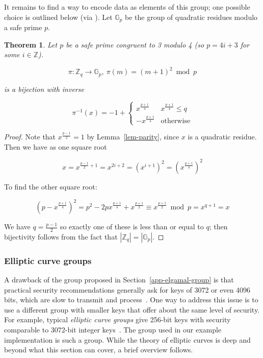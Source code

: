\documentclass[12pt,a4paper]{article}
\newtheorem{theorem}{Theorem}
\theoremstyle{definition}
\begin{document}
It remains to find a way to encode data as elements of this group; one possible choice is outlined below (via \cite{katz2014introduction}). Let $\mathbb{G}_p$ be the group of quadratic residues modulo a safe prime $p$.
\begin{theorem}
    Let $p$ be a safe prime congruent to 3 modulo 4 (so $p=4i+3$ for some $i\in\mathbb{Z}$).

    $$\pi:\mathbb{Z}_q\rightarrow\mathbb{G}_p,\ \pi(m)=(m+1)^2\bmod p$$

    is a bijection with inverse

    $$\pi^{-1}(x)=-1+\begin{cases}
        x^\frac{p+1}{4} & x^\frac{p+1}{4}\leq q\\
        -x^\frac{p+1}{4}&\text{otherwise}
    \end{cases}$$

\end{theorem}
\begin{proof}
    Note that $x^\frac{p-1}{2}=1$ by Lemma~\ref{lem-parity}, since $x$ is a quadratic residue. Then we have as one square root

    $$x=x^{\frac{p-1}{2}+1}=x^{2i+2}=(x^{i+1})^2=\left(x^\frac{p+1}{4}\right)^2$$

    To find the other square root:

    $$\left(p-x^\frac{p+1}{4}\right)^2=p^2-2px^\frac{p+1}{4}+x^\frac{p+1}{2}\equiv x^\frac{p+1}{2}\bmod p=x^{q+1}=x$$

    We have $q=\frac{p-1}{2}$ so exactly one of these is less than or equal to $q$; then bijectivity follows from the fact that $|\mathbb{Z}_q|=|\mathbb{G}_p|$.



\end{proof}

\subsubsection{Elliptic curve groups}
A drawback of the group proposed in Section~\ref{app-elgamal-group} is that practical security recommendations generally ask for keys of 3072 or even 4096 bits, which are slow to transmit and process~\cite{barker2018transitioning}. One way to address this issue is to use a different group with smaller keys that offer about the same level of security. For example, typical \textit{elliptic curve groups} give 256-bit keys with security comparable to 3072-bit integer keys~\cite{bafandehkar2013comparison}. The group used in our example implementation is such a group. While the theory of elliptic curves is deep and beyond what this section can cover, a brief overview follows.
\end{document}
